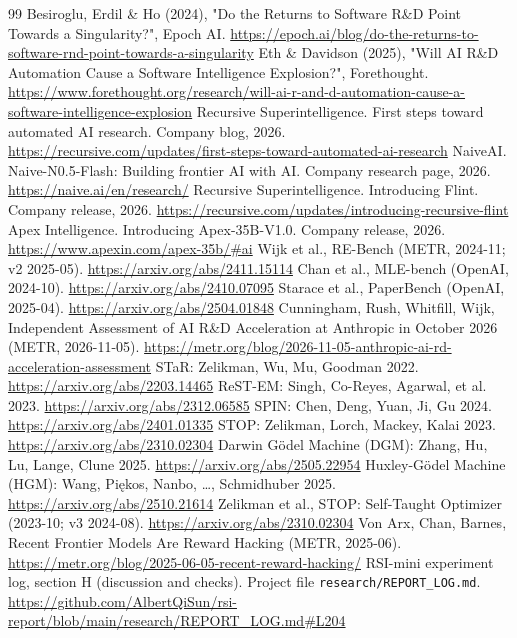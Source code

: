 \begin{thebibliography}{99}
 Besiroglu, Erdil \& Ho (2024), "Do the Returns to Software R\&D Point Towards a Singularity?", Epoch AI. \url{https://epoch.ai/blog/do-the-returns-to-software-rnd-point-towards-a-singularity}
 Eth \& Davidson (2025), "Will AI R\&D Automation Cause a Software Intelligence Explosion?", Forethought. \url{https://www.forethought.org/research/will-ai-r-and-d-automation-cause-a-software-intelligence-explosion}
 Recursive Superintelligence. First steps toward automated AI research. Company blog, 2026. \url{https://recursive.com/updates/first-steps-toward-automated-ai-research}
 NaiveAI. Naive-N0.5-Flash: Building frontier AI with AI. Company research page, 2026. \url{https://naive.ai/en/research/}
 Recursive Superintelligence. Introducing Flint. Company release, 2026. \url{https://recursive.com/updates/introducing-recursive-flint}
 Apex Intelligence. Introducing Apex-35B-V1.0. Company release, 2026. \url{https://www.apexin.com/apex-35b/#ai}
 Wijk et al., RE-Bench (METR, 2024-11; v2 2025-05). \url{https://arxiv.org/abs/2411.15114}
 Chan et al., MLE-bench (OpenAI, 2024-10). \url{https://arxiv.org/abs/2410.07095}
 Starace et al., PaperBench (OpenAI, 2025-04). \url{https://arxiv.org/abs/2504.01848}
 Cunningham, Rush, Whitfill, Wijk, Independent Assessment of AI R\&D Acceleration at Anthropic in October 2026 (METR, 2026-11-05). \url{https://metr.org/blog/2026-11-05-anthropic-ai-rd-acceleration-assessment}
 STaR: Zelikman, Wu, Mu, Goodman 2022. \url{https://arxiv.org/abs/2203.14465}
 ReST-EM: Singh, Co-Reyes, Agarwal, et al. 2023. \url{https://arxiv.org/abs/2312.06585}
 SPIN: Chen, Deng, Yuan, Ji, Gu 2024. \url{https://arxiv.org/abs/2401.01335}
 STOP: Zelikman, Lorch, Mackey, Kalai 2023. \url{https://arxiv.org/abs/2310.02304}
 Darwin Gödel Machine (DGM): Zhang, Hu, Lu, Lange, Clune 2025. \url{https://arxiv.org/abs/2505.22954}
 Huxley-Gödel Machine (HGM): Wang, Piękos, Nanbo, …, Schmidhuber 2025. \url{https://arxiv.org/abs/2510.21614}
 Zelikman et al., STOP: Self-Taught Optimizer (2023-10; v3 2024-08). \url{https://arxiv.org/abs/2310.02304}
 Von Arx, Chan, Barnes, Recent Frontier Models Are Reward Hacking (METR, 2025-06). \url{https://metr.org/blog/2025-06-05-recent-reward-hacking/}
 RSI-mini experiment log, section H (discussion and checks). Project file \texttt{research/REPORT\_LOG.md}. \url{https://github.com/AlbertQiSun/rsi-report/blob/main/research/REPORT_LOG.md#L204}

\end{thebibliography}
